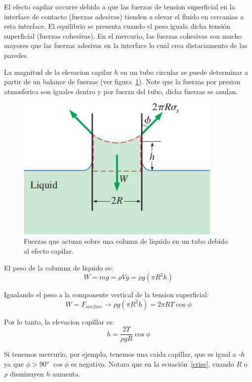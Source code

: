 \documentclass[10pt, oneside]{article}
\begin{document}
El efecto capilar occurre debido a que las fuerzas de tension superficial en la interface de contacto (fuerzas adesivas) tienden a elevar el fluido en cercanias a esta interface. El equilibrio se presenta cuando el peso iguala dicha tensi\'on superficial (fuerzas cohesivas). En el mercurio, las fuerzas cohesivas son mucho mayores que las fuerzas adesivas en la interface lo cual crea distaciamento de las paredes.  

La magnitud de la elevacion capilar $h$  en un tubo circular se puede determinar a partir de un balance de fuerzas (ver figura~\ref{ecfu}). Note que la fuerzas por presion atmosferica son iguales dentro y por fuerza del tubo, dicha fuerzas se anulan.  

\begin{figure}[h]
\centering
\includegraphics[width=10cm]{ecfuer}
\caption{Fuerzas que actuan sobre una column de liquido en un tubo debido al efecto capilar.}
\label{ecfu}
\end{figure}

El peso de la columna de liquido es:
$$
W = mg = \rho V g = \rho g (\pi R^2 h)
$$

Igualando el peso a la componente vertical de la tension superficial:
$$
W=F_{surface} \rightarrow \rho g (\pi R^2 h) = 2\pi R \Upsilon \cos \phi
$$

Por lo tanto, la elevacion capillar es:
\begin{equation}
h=\frac{2 \Upsilon}{\rho g R} \cos \phi
\label{crise}
\end{equation}

 Si tenemos mercurio, por ejemplo, tenemos una caida capillar, que es igual a -$h$ ya que  $\phi > 90^o$ $\cos \phi$ es negativo. Notara que en la ecuaci\'on~\ref{crise}, cuando $R$ o $\rho$ disminuyen $h$ aumenta.  
\end{document}
